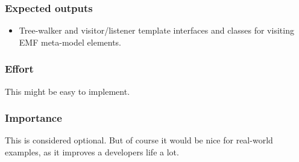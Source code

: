 \subsubsection{Expected outputs}
\begin{itemize}
	\item Tree-walker and visitor/listener template
	interfaces and classes for visiting EMF
	meta-model elements.
\end{itemize}
\subsubsection{Effort}
This might be easy to implement.
\subsubsection{Importance}
This is considered optional. But of course it would be nice
for real-world examples, as it improves a developers life 
a lot.
